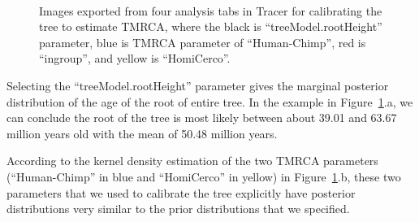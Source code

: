 \documentclass{bioinfo}
\begin{document}
\begin{figure}[ht]
\\
\caption{Images exported from four analysis tabs in Tracer for calibrating the tree to estimate TMRCA, where the black is ``treeModel.rootHeight'' parameter, blue is TMRCA parameter of ``Human-Chimp'', red is ``ingroup'', and yellow is ``HomiCerco''.}
\label{fig:4tabs}
\end{figure}

Selecting the ``treeModel.rootHeight'' parameter gives the marginal posterior distribution of the age of the root of entire tree. In the example in Figure~\ref{fig:4tabs}.a, we can conclude the root of the tree is most likely between about 39.01 and 63.67 million years old with the mean of 50.48 million years.

According to the kernel density estimation of the two TMRCA parameters (``Human-Chimp'' in blue and ``HomiCerco'' in yellow) in Figure~\ref{fig:4tabs}.b, these two parameters that we used to calibrate the tree explicitly have posterior distributions very similar to the prior distributions that we specified.
\end{document}
